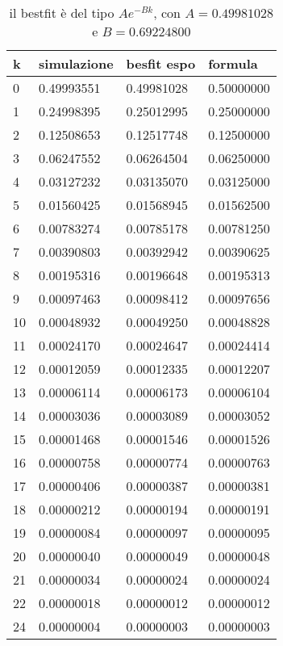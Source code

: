 \documentclass[paper=a4, fontsize=11pt]{scrartcl} %
\numberwithin{equation}{section} %
\numberwithin{figure}{section} %
\numberwithin{table}{section} %
\newcommand{\horrule}[1]{\rule{\linewidth}{#1}} %
\begin{document}
\begin{table} 
	\centering 
	\begin{tabular}{l l l l } 
		\toprule
k & simulazione& besfit espo & formula \\
\midrule
0 & 0.49993551 & 0.49981028 & 0.50000000 \\ 
1 & 0.24998395 & 0.25012995 & 0.25000000 \\ 
2 & 0.12508653 & 0.12517748 & 0.12500000 \\ 
3 & 0.06247552 & 0.06264504 & 0.06250000 \\ 
4 & 0.03127232 & 0.03135070 & 0.03125000 \\ 
5 & 0.01560425 & 0.01568945 & 0.01562500 \\ 
6 & 0.00783274 & 0.00785178 & 0.00781250 \\ 
7 & 0.00390803 & 0.00392942 & 0.00390625 \\ 
8 & 0.00195316 & 0.00196648 & 0.00195313 \\ 
9 & 0.00097463 & 0.00098412 & 0.00097656 \\ 
10 & 0.00048932 & 0.00049250 & 0.00048828 \\ 
11 & 0.00024170 & 0.00024647 & 0.00024414 \\ 
12 & 0.00012059 & 0.00012335 & 0.00012207 \\ 
13 & 0.00006114 & 0.00006173 & 0.00006104 \\ 
14 & 0.00003036 & 0.00003089 & 0.00003052 \\ 
15 & 0.00001468 & 0.00001546 & 0.00001526 \\ 
16 & 0.00000758 & 0.00000774 & 0.00000763 \\ 
17 & 0.00000406 & 0.00000387 & 0.00000381 \\ 
18 & 0.00000212 & 0.00000194 & 0.00000191 \\ 
19 & 0.00000084 & 0.00000097 & 0.00000095 \\ 
20 & 0.00000040 & 0.00000049 & 0.00000048 \\ 
21 & 0.00000034 & 0.00000024 & 0.00000024 \\ 
22 & 0.00000018 & 0.00000012 & 0.00000012 \\ 
24 & 0.00000004 & 0.00000003 & 0.00000003 \\ 

		\bottomrule %
	\end{tabular}
	\caption{il bestfit è del tipo $A e^{-B k}$, con $A=0.49981028$ e $B=0.69224800$} %
	\label{tab:template} %
\end{table}

%
\end{document}
